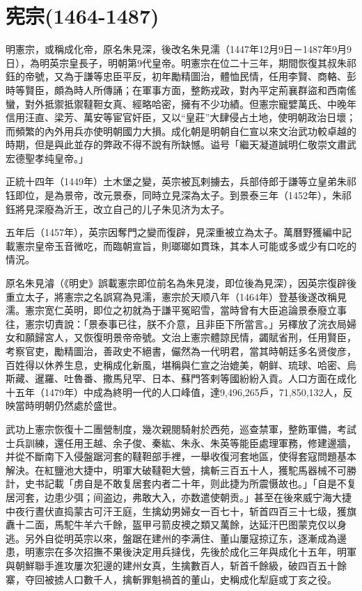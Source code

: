 
\section{宪宗\tiny(1464-1487)}

明憲宗，或稱成化帝，原名朱見深，後改名朱見濡（1447年12月9日－1487年9月9日），為明英宗皇長子，明朝第9代皇帝。明憲宗在位二十三年，期間恢復其叔朱祁鈺的帝號，又為于謙等忠臣平反，初年勵精圖治，體恤民情，任用李賢、商輅、彭時等賢臣，頗為時人所傳誦；在軍事方面，整飭戎政，對內平定荊襄群盜和西南傜蠻，對外抵禦抵禦韃靼女真、經略哈密，擁有不少功績。但憲宗寵嬖萬氏、中晚年信用汪直、梁芳、萬安等宦官奸臣，又以“皇莊”大肆侵占土地，使明朝政治日壞；而頻繁的內外用兵亦使明朝國力大損。成化朝是明朝自仁宣以來文治武功較卓越的時期，但是與此並存的弊政不得不說有所缺憾。谥号「繼天凝道誠明仁敬崇文肅武宏德聖孝纯皇帝。」

正統十四年（1449年）土木堡之變，英宗被瓦剌擄去，兵部侍郎于謙等立皇弟朱祁钰即位，是為景帝，改元景泰，同時立見深為太子。到景泰三年（1452年），朱祁鈺將見深廢為沂王，改立自己的儿子朱见济为太子。

五年后（1457年），英宗因奪門之變而復辟，見深重被立為太子。萬曆野獲編中記載憲宗皇帝玉音微吃，而臨朝宣旨，則瑯瑯如貫珠，其本人可能或多或少有口吃的情況。

原名朱見濬（《明史》誤載憲宗即位前名為朱見浚，即位後為見深），因英宗復辟後重立太子，將憲宗之名誤寫為見濡，憲宗於天顺八年（1464年）登基後遂改稱見濡。憲宗宽仁英明，即位之初就為于謙平冤昭雪，當時曾有大臣追論景泰廢立事往，憲宗切責說：「景泰事已往，朕不介意，且非臣下所當言。」另䆁放了浣衣局婦女和願歸宮人，又恢復明景帝帝號。文治上憲宗體諒民情，蠲賦省刑，任用賢臣，考察官吏，勵精圖治，善政史不絕書，儼然為一代明君，當其時朝廷多名贤俊彦，百姓得以休养生息，史稱成化新風，堪稱與仁宣之治媲美，朝鲜、琉球、哈密、烏斯藏、暹羅、吐魯番、撒馬兒罕、日本、蘇門答剌等國紛紛入貢。人口方面在成化十五年（1479年）中成為終明一代的人口峰值，達9,496,265戶，71,850,132人，反映當時明朝仍然處於盛世。

武功上憲宗恢復十二團營制度，幾次親閱騎射於西苑，巡查禁軍，整飭軍備，考試士兵訓練，還任用王越、余子俊、秦紘、朱永、朱英等能臣處理軍務，修建邊牆，并從不斷南下入侵盤踞河套的韃靼部手裡，一舉收復河套地區，使得套寇問題基本解決。在紅鹽池大捷中，明軍大破韃靼大營，擒斬三百五十人，獲駝馬器械不可勝計，史书記載「虏自是不敢复居套内者二十年，则此捷为所震慑故也。」「自是不复居河套，边患少弭；间盗边，弗敢大入，亦数遣使朝贡。」甚至在後來威宁海大捷中夜行晝伏直捣蒙古可汗王庭，生擒幼男婦女一百七十，斩首四百三十七级，獲旗纛十二面，馬駝牛羊六千餘，盔甲弓箭皮襖之類又萬餘，达延汗巴图蒙克仅以身逃。另外自從明英宗以來，盤踞在建州的李满住、董山屢寇掠辽东，逐漸成為邊患，明憲宗在多次招撫不果後決定用兵撻伐，先後於成化三年與成化十五年，明軍與朝鮮聯手進攻屢次犯邊的建州女真，生擒數百人，斩首千餘級，破四百五十餘寨，夺回被掳人口數千人，擒斬罪魁禍首的董山，史稱成化犁庭或丁亥之役。

